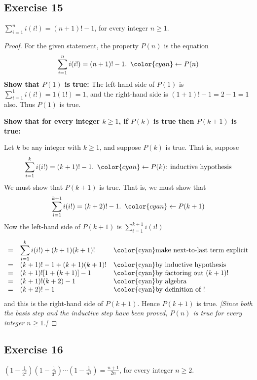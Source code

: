 \documentclass[14pt]{extarticle}
\newcommand{\dps}{\displaystyle}
\newcommand{\from}{\leftarrow}
\newcommand{\cy}{\color{cyan}}
\begin{document}
\subsection{Exercise 15}
$\dps \sum_{i=1}^{n}i(i!) = (n+1)! - 1$, for every integer $n \geq 1$.

\begin{proof}
    For the given statement, the property $P(n)$ is the equation
    \[
        \dps \sum_{i=1}^{n}i(i!) = (n+1)! - 1. \,\,\, {\cy \from P(n)}
    \]
    {\bf Show that $P(1)$ is true:} The left-hand side of $P(1)$ is $\dps \sum_{i=1}^{1}i(i!) = 1(1!) = 1$, and the right-hand side is $(1+1)! - 1 = 2 - 1 = 1$ also. Thus $P(1)$ is true.

        {\bf Show that for every integer $k \geq 1$, if $P(k)$ is true then $P(k + 1)$ is true:}

    Let $k$ be any integer with $k \geq 1$, and suppose $P(k)$ is true. That is, suppose
    \[
        \dps \sum_{i=1}^{k}i(i!) = (k+1)! - 1. \,\,\, {\cy \from P(k) \text{: inductive hypothesis}}
    \]
    We must show that $P(k + 1)$ is true. That is, we must show that
    \[
        \dps \sum_{i=1}^{k+1}i(i!) = (k+2)! - 1. \,\,\,{\cy \from P(k+1)}
    \]
    Now the left-hand side of $P(k + 1)$ is $\dps \sum_{i=1}^{k+1}i(i!)$

    \[
        \begin{array}{lll}
            = & \dps \sum_{i=1}^{k}i(i!) + (k+1)(k+1)! & \text{\cy make next-to-last term explicit} \\
            = & (k+1)! - 1 + (k+1)(k+1)!               & \text{\cy by inductive hypothesis}         \\
            = & (k+1)![1 + (k+1)] - 1                  & \text{\cy by factoring out $(k+1)!$}       \\
            = & (k+1)!(k+2) - 1                        & \text{\cy by algebra}                      \\
            = & (k+2)! - 1                             & \text{\cy by definition of !}
        \end{array}
    \]
    and this is the right-hand side of $P(k + 1)$. Hence $P(k + 1)$ is true. {\it [Since both the basis step and the inductive step have been proved, $P(n)$ is true for every integer $n \geq 1$.]}
\end{proof}

\subsection{Exercise 16}
$\dps \left(1 - \frac{1}{2^2}\right)\left(1 - \frac{1}{3^2}\right) \cdots \left(1 - \frac{1}{n^2}\right) = \frac{n+1}{2n}$, for every integer $n \geq 2$.
\end{document}
